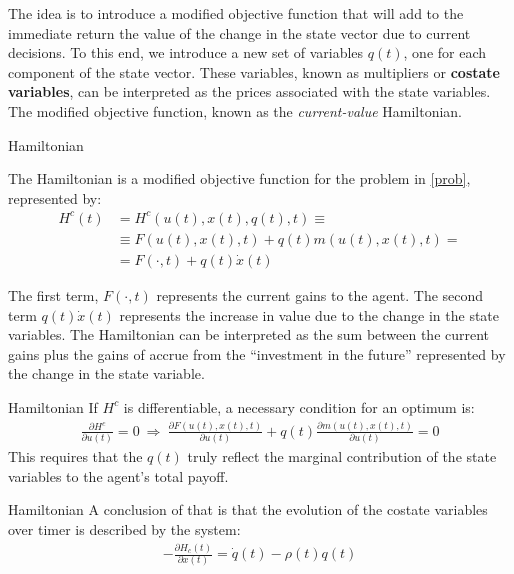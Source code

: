 \documentclass[aspectratio=169]{beamer}
\begin{document}
\begin{frame}
    
    The idea is to introduce a modified objective function that will add to the immediate return the value of the change in the state vector due to current decisions. To this end, we introduce a new set of variables $q(t)$, one for each component of the state vector. These variables, known as multipliers or \textbf{costate variables}, can be interpreted as the prices associated with the state variables. The modified objective function, known as the \textit{current-value} Hamiltonian.
    
\end{frame}

\begin{frame}{Hamiltonian}
    \begin{definition}
        The Hamiltonian is a modified objective function for the problem in \eqref{prob}, represented by:
        \begin{align*}
            H^c(t)&=H^c(u(t),x(t),q(t),t)\equiv \\ &\equiv F(u(t),x(t),t)+q(t)m(u(t),x(t),t)=\\&=F(\cdot,t)+q(t)\dot{x}(t)
        \end{align*}
    \end{definition}
    
    The first term, $F(\cdot,t)$ represents the current gains to the agent. The second term $q(t)\dot{x}(t)$ represents the increase in value due to the change in the state variables. The Hamiltonian can be interpreted as the sum between the current gains plus the gains of accrue from the ``investment in the future'' represented by the change in the state variable.
    
\end{frame}

\begin{frame}{Hamiltonian}
    If $H^c$ is differentiable, a necessary condition for an optimum is:
    \begin{align*}
        \frac{\partial H^c}{\partial u(t)}=0\ \Rightarrow\ \frac{\partial F(u(t),x(t),t)}{\partial u(t)} + q(t)\frac{\partial m(u(t),x(t),t)}{\partial u(t)}=0
    \end{align*}
    This requires that the $q(t)$ truly reflect the marginal contribution of the state variables to the agent's total payoff.
\end{frame}

\begin{frame}{Hamiltonian}
    A conclusion of that is that the evolution of the costate variables over timer is described by the system:
    \begin{align*}
        -\frac{\partial H_c(t)}{\partial x(t)}=\dot{q}(t)-\rho(t)q(t)
    \end{align*}
\end{frame}
\end{document}
